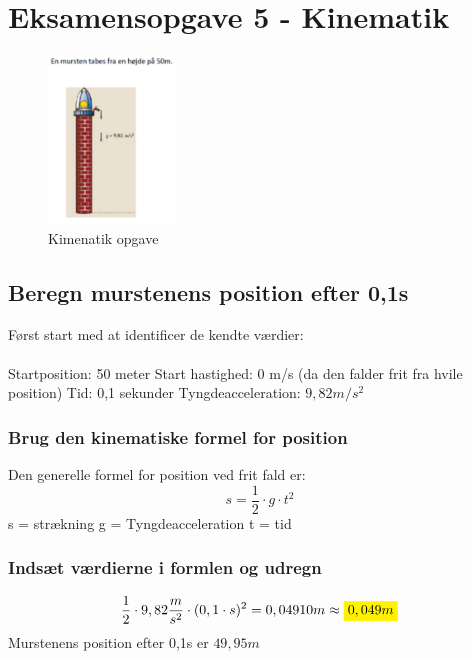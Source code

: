 \newpage
\section{Eksamensopgave 5 - Kinematik}
\begin{figure}[h!]
    \centering
    \includegraphics[width=0.3\textwidth]{figures/kinematik.png}
    \caption{Kimenatik opgave}
\end{figure}

\subsection{Beregn murstenens position efter 0,1s}
Først start med at identificer de kendte værdier:
\\\\
Startposition: 50 meter \newline
Start hastighed: 0 m/s (da den falder frit fra hvile position)\newline
Tid: 0,1 sekunder \newline
Tyngdeacceleration: \begin{math}9,82m/s^{2}\end{math}


\subsubsection{Brug den kinematiske formel for position}
Den generelle formel for position ved frit fald er:
\begin{equation*}
    s= \frac{1}{2} \cdot g \cdot t^{2}
\end{equation*}
s = strækning\newline
g = Tyngdeacceleration\newline
t = tid

\subsubsection{Indsæt værdierne i formlen og udregn}
\begin{equation*}
    \frac{1}{2} \cdot 9,82 \frac{m}{s^{2}}\cdot (0,1 \cdot s)^{2}= 0,04910m \approx \mathcolorbox{yellow}{0,049m}
\end{equation*}
Murstenens position efter 0,1s er $49,95m$

